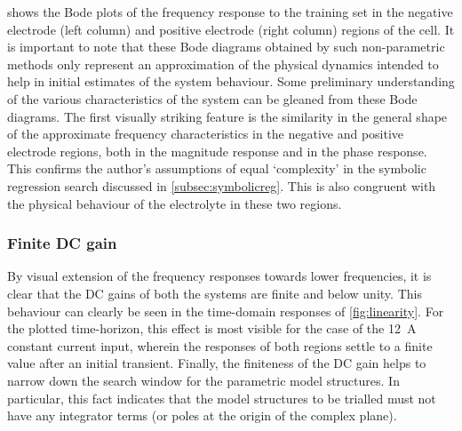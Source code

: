  shows  the  Bode  plots  of  the  frequency response
to the training set in the negative electrode (left column) and positive
electrode (right column) regions of the cell. It is important to note that these
Bode diagrams obtained by such non-parametric methods only represent  an
approximation of the  physical dynamics intended to help in initial estimates of
the system behaviour. Some preliminary understanding of the  various
characteristics of the system can be gleaned from these Bode diagrams.  The
first visually striking feature is the similarity  in the  general shape of the
approximate frequency characteristics in  the negative  and positive electrode
regions, both in the magnitude response and in the phase response. This confirms
the author's assumptions of equal `complexity' in the symbolic  regression
search discussed in \cref{subsec:symbolicreg}.  This is also  congruent with
the physical  behaviour of  the electrolyte  in these  two regions.

\subsubsection*{Finite DC gain}
By visual  extension of  the frequency responses  towards lower  frequencies, it
is  clear  that  the  DC  gains  of  both  the  systems  are  finite  and  below
unity.  This  behaviour  can  clearly  be  seen  in  the  time-domain  responses
of \cref{fig:linearity}.  For  the plotted  time-horizon,  this  effect is  most
visible for the case of the \SI{12}{\ampere} constant current input, wherein the
responses of both regions settle to a finite value after an initial transient.
Finally, the finiteness  of the DC gain  helps to narrow down  the search window
for the parametric model structures. In particular, this fact indicates that the
model structures to be trialled must not  have any integrator terms (or poles at
the origin of the complex plane).



